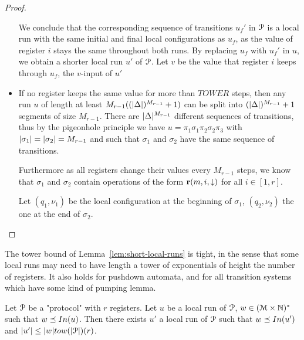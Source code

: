 \begin{proof}
\begin{itemize}
		We conclude that the corresponding sequence of transitions $u_f'$ in $\mathcal{P}$ is a local run with the same initial and final local configurations as $u_f$, as the value of register $i$ stays the same throughout both runs. By replacing $u_f$ with $u_f'$ in $u$, we obtain a shorter local run $u'$ of $\mathcal{P}$. Let $v$ be the value that register $i$ keeps through $u_f$, the $v$-input of $u'$ 
		
		\item If no register keeps the same value for more than $TOWER$ steps, then any run $u$ of length at least $M_{r-1} ((|\Delta|)^{M_{r-1}} +1)$ can be split into $(|\Delta|)^{M_{r-1}} +1$ segments of size $M_{r-1}$. There are $|\Delta|^{M_{r-1}}$ different sequences of transitions, thus by the pigeonhole principle we have $u = \pi_1 \sigma_1 \pi_2 \sigma_2 \pi_3$ with $|\sigma_1| = |\sigma_2| = M_{r-1}$ and such that  $\sigma_1$ and $\sigma_2$ have the same sequence of transitions.
		
		Furthermore as all registers change their values every $M_{r-1}$ steps, we know that $\sigma_1$ and $\sigma_2$ contain operations of the form $\textbf{r}(m, i, \downarrow)$ for all $i \in [1,r]$.
		
		Let $(q_1, \nu_1)$ be the local configuration at the beginning of $\sigma_1$, $(q_2, \nu_2)$ the one at the end of $\sigma_2$.
	\end{itemize}
	
\end{proof}
\fi 

\begin{remark}
	The tower bound of Lemma~\ref{lem:short-local-runs} is tight, in the sense that some local runs may need to have length a tower of exponentials of height the number of registers.
	It also holds for pushdown automata, and for all transition systems which have some kind of pumping lemma.
\end{remark}

\begin{lemma}
	Let $\mathcal{P}$ be a "protocol" with $r$ registers.
	Let $u$ be a local run of $\mathcal{P}$, $w \in (\mathcal{M} \times \mathbb{N})^*$ such that $w \subword \Input{u}$. 
	Then there exists $u'$ a local run of $\mathcal{P}$ such that $w \subword \Input{u'}$ and $\size{u'} \leq \size{w}\towerfun(\size{\prot})(r)$.
\end{lemma}

